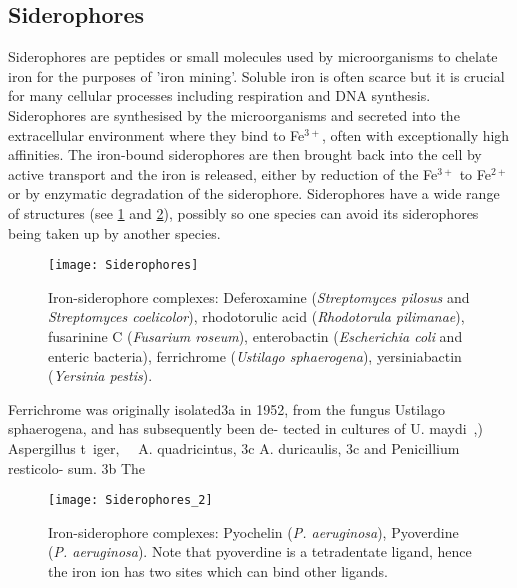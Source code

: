 \subsection{Siderophores}

Siderophores are peptides or small molecules used by microorganisms to chelate iron for the purposes of 'iron mining'\cite{Hider2010}. Soluble iron is often scarce but it is crucial for many cellular processes including respiration and DNA synthesis. Siderophores are synthesised by the microorganisms and secreted into the extracellular environment where they bind to Fe$^{3+}$, often with exceptionally high affinities. The iron-bound siderophores are then brought back into the cell by active transport and the iron is released, either by reduction of the Fe$^{3+}$ to Fe$^{2+}$ or by enzymatic degradation of the siderophore. Siderophores have a wide range of structures (see \ref{fgr:Sids} and \ref{fgr:Sids_2}), possibly so one species can avoid its siderophores being taken up by another species\cite{Seyedsayamdost2012}.

\begin{figure}[H]
	\begin{center}
		\texttt{[image: Siderophores]}
		\caption{Iron-siderophore complexes:
		Deferoxamine \cite{Zheng2012} (\textit{Streptomyces pilosus} and \textit{Streptomyces coelicolor}), 
		rhodotorulic acid \cite{Carrano1978} (\textit{Rhodotorula pilimanae}),
		fusarinine C \cite{Hossain1980} (\textit{Fusarium roseum}),
		enterobactin \cite{Zheng2012} (\textit{Escherichia coli} and enteric bacteria),
		ferrichrome \cite{vanderHelm1980} (\textit{Ustilago sphaerogena}),
		yersiniabactin \cite{Zheng2012} (\textit{Yersinia pestis}).
		\label{fgr:Sids}}
	\end{center}
\end{figure}

Ferrichrome was originally isolated3a in 1952, from the
fungus Ustilago sphaerogena, and has subsequently been de- tected in cultures of U. maydi~,)~ Aspergillus t~iger,~~ A. quadricintus, 3c A. duricaulis, 3c and Penicillium resticolo- sum. 3b The

\begin{figure}[H]
	\begin{center}
		\texttt{[image: Siderophores\_2]}
		\caption{Iron-siderophore complexes:
		Pyochelin \cite{Schlegel2006} (\textit{P. aeruginosa}),
		Pyoverdine \cite{Zheng2012} (\textit{P. aeruginosa}). Note that pyoverdine  is a tetradentate ligand, hence the iron ion has two sites which can bind other ligands. \label{fgr:Sids_2}}
	\end{center}
\end{figure}

